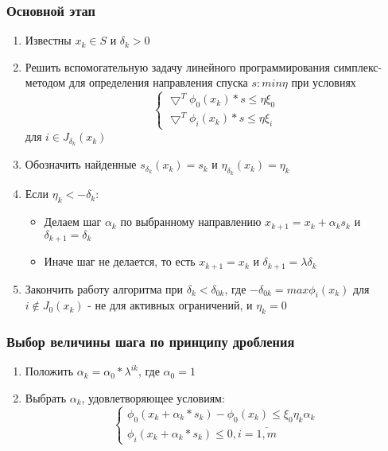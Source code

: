 \documentclass[../body.tex]{subfiles}
\begin{document}
\subsubsection{Основной этап}
\begin{enumerate}
    \item Известны $x_k\in S$ и $\delta_k>0$
    \item Решить вспомогательную задачу линейного программирования симплекс-методом для определения направления спуска $s:min\eta$ при условиях
        \begin{equation}
            \left\{
            \begin{array}{ll}
                \bigtriangledown^T\phi_0(x_k)*s\leq\eta\xi_0\\
                \bigtriangledown^T\phi_i(x_k)*s\leq\eta\xi_i
            \end{array}
            \right.
        \end{equation}
        для $i\in J_{\delta_k}(x_k)$
    \item Обозначить найденные $s_{\delta_k}(x_k)=s_k$ и $\eta_{\delta_k}(x_k)=\eta_k$
    \item Если $\eta_k<-\delta_k:$
        \begin{itemize}
            \item Делаем шаг $\alpha_k$ по выбранному направлению $x_{k+1}=x_k+\alpha_ks_k$ и $\delta_{k+1}=\delta_k$
            \item Иначе шаг не делается, то есть $x_{k+1}=x_k$ и $\delta_{k+1}=\lambda\delta_k$
        \end{itemize}
    \item Закончить работу алгоритма при $\delta_k<\delta_{0k}$, где $-\delta_{0k}=max\phi_i(x_k)$ для $i\not\in J_0(x_k)$ - не для активных ограничений, и $\eta_k=0$
\end{enumerate}

\subsubsection{Выбор величины шага по принципу дробления}
\begin{enumerate}
    \item Положить $\alpha_k=\alpha_0*\lambda^{ik}$, где $\alpha_0=1$
    \item Выбрать $\alpha_k$, удовлетворяющее условиям:
        \begin{equation}
            \left\{
            \begin{array}{ll}
                \phi_0(x_k+\alpha_k*s_k)-\phi_0(x_k)\leq\xi_0\eta_k\alpha_k\\
                \phi_i(x_k+\alpha_k*s_k)\leq0,i=\overline{1,m}
            \end{array}
            \right.
        \end{equation}
\end{enumerate}
\end{document}
